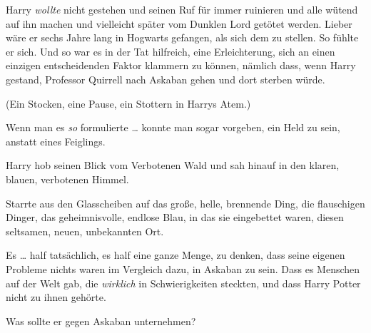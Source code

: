 Harry \emph{wollte} nicht gestehen und seinen Ruf für immer ruinieren und alle wütend auf ihn machen und vielleicht später vom Dunklen Lord getötet werden. Lieber wäre er sechs Jahre lang in Hogwarts gefangen, als sich dem zu stellen. So fühlte er sich. Und so war es in der Tat hilfreich, eine Erleichterung, sich an einen einzigen entscheidenden Faktor klammern zu können, nämlich dass, wenn Harry gestand, Professor Quirrell nach Askaban gehen und dort sterben würde.

(Ein Stocken, eine Pause, ein Stottern in Harrys Atem.)

Wenn man es \emph{so} formulierte … konnte man sogar vorgeben, ein Held zu sein, anstatt eines Feiglings.

Harry hob seinen Blick vom Verbotenen Wald und sah hinauf in den klaren, blauen, verbotenen Himmel.

Starrte aus den Glasscheiben auf das große, helle, brennende Ding, die flauschigen Dinger, das geheimnisvolle, endlose Blau, in das sie eingebettet waren, diesen seltsamen, neuen, unbekannten Ort.

Es … half tatsächlich, es half eine ganze Menge, zu denken, dass seine eigenen Probleme nichts waren im Vergleich dazu, in Askaban zu sein. Dass es Menschen auf der Welt gab, die \emph{wirklich} in Schwierigkeiten steckten, und dass Harry Potter nicht zu ihnen gehörte.

Was sollte er gegen Askaban unternehmen?

